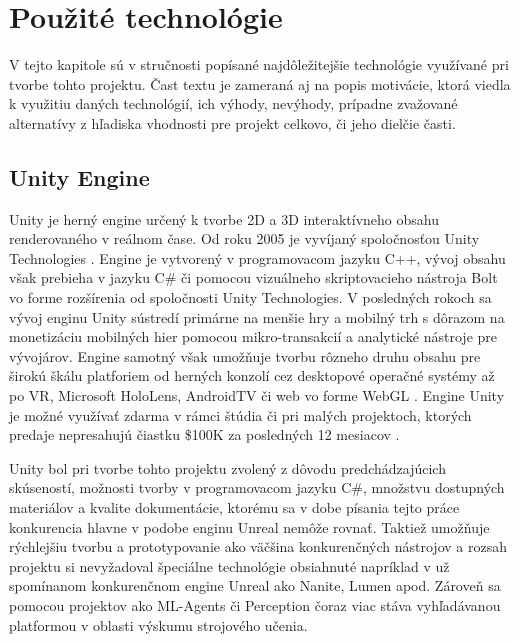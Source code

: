 \documentclass[slovak, master]{diploma}
\begin{document}
\chapter{Použité technológie}
\label{sec:Tech}
V tejto kapitole sú v stručnosti popísané najdôležitejšie technológie využívané pri tvorbe tohto projektu. Čast textu je zameraná aj na popis motivácie, ktorá viedla k využitiu daných technológií, ich výhody, nevýhody, prípadne zvažované alternatívy z hľadiska vhodnosti pre projekt celkovo, či jeho dielčie časti.

\section{Unity Engine}
\label{sec:Unity}
Unity je herný engine určený k tvorbe 2D a 3D interaktívneho obsahu renderovaného v reálnom čase. Od roku 2005 je vyvíjaný spoločnosťou Unity Technologies \cite{Unity}. Engine je vytvorený v programovacom jazyku C++, vývoj obsahu však prebieha v jazyku C\# či pomocou vizuálneho skriptovacieho nástroja Bolt vo forme rozšírenia od spoločnosti Unity Technologies. V posledných rokoch sa vývoj enginu Unity sústredí primárne na menšie hry a mobilný trh s dôrazom na monetizáciu mobilných hier pomocou mikro-transakcií a analytické nástroje pre vývojárov. Engine samotný však umožňuje tvorbu rôzneho druhu obsahu pre širokú škálu platforiem od herných konzolí cez desktopové operačné systémy až po VR, Microsoft HoloLens, AndroidTV či web vo forme WebGL \cite{UnityMultiplatform}. Engine Unity je možné využívať zdarma v rámci štúdia či pri malých projektoch, ktorých predaje nepresahujú čiastku \$100K za posledných 12 mesiacov \cite{UnityPersonal}.

Unity bol pri tvorbe tohto projektu zvolený z dôvodu predchádzajúcich skúseností, možnosti tvorby v programovacom jazyku C\#, množstvu dostupných materiálov a kvalite dokumentácie, ktorému sa v dobe písania tejto práce konkurencia hlavne v podobe enginu Unreal nemôže rovnať. Taktiež umožňuje rýchlejšiu tvorbu a prototypovanie ako väčšina konkurenčných nástrojov a rozsah projektu si nevyžadoval špeciálne technológie obsiahnuté napríklad v už spomínanom konkurenčnom engine Unreal ako Nanite, Lumen apod. Zároveň sa pomocou projektov ako ML-Agents či Perception čoraz viac stáva vyhľadávanou platformou v oblasti výskumu strojového učenia.
\end{document}
